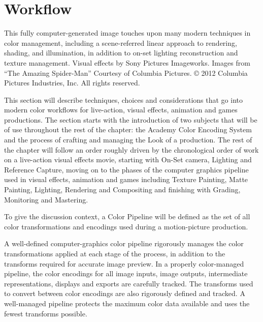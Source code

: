 \chapter{Workflow}

This fully computer-generated image touches upon many modern techniques in color management, including a scene-referred linear approach to rendering, shading, and illumination, in addition to on-set lighting reconstruction and texture management. 
Visual effects by Sony Pictures Imageworks. Images from “The Amazing Spider-Man” Courtesy of Columbia Pictures. © 2012 Columbia Pictures Industries, Inc. All rights reserved.

This section will describe techniques, choices and considerations that go into modern color workflows for live-action, visual effects, animation and games productions. The section starts with the introduction of two subjects that will be of use throughout the rest of the chapter: the Academy Color Encoding System and the process of crafting and managing the Look of a production. The rest of the chapter will follow an order roughly driven by the chronological order of work on a live-action visual effects movie, starting with On-Set camera, Lighting and Reference Capture, moving on to the phases of the computer graphics pipeline used in visual effects, animation and games including Texture Painting, Matte Painting, Lighting, Rendering and Compositing and finishing with Grading, Monitoring and Mastering.

To give the discussion context, a Color Pipeline will be defined as the set of all color transformations and encodings used during a motion-picture production.

A well-defined computer-graphics color pipeline rigorously manages the color transformations applied at each stage of the process, in addition to the transforms required for accurate image preview.
In a properly color-managed pipeline, the color encodings for all image inputs, image outputs, intermediate representations, displays and exports are carefully tracked. The transforms used to convert between color encodings are also rigorously defined and tracked. A well-managed pipeline protects the maximum color data available and uses the fewest transforms possible.  



















